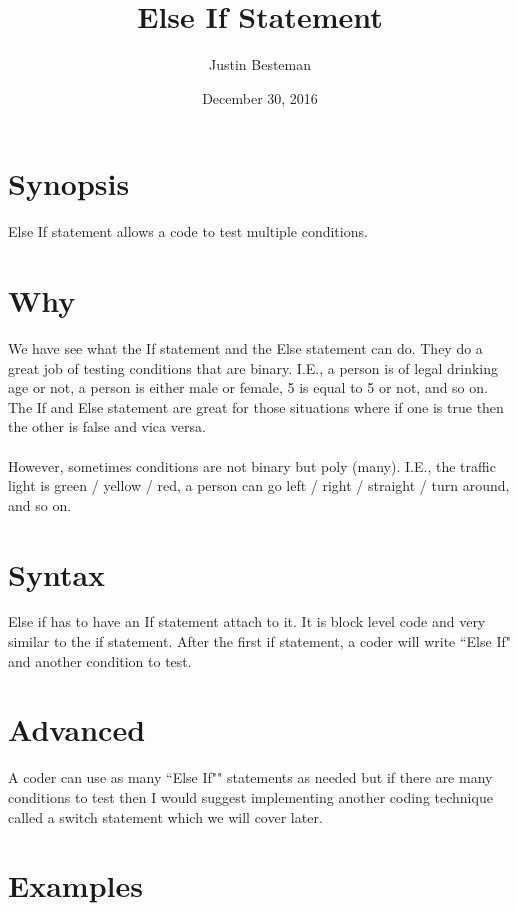 \documentclass[12pt, letterpaper]{article}
\title{Else If Statement}
\author{Justin Besteman}
\date{December 30, 2016}
\begin{document}
\maketitle


\section*{Synopsis}

Else If statement allows a code to test multiple conditions.

\section*{Why}

We have see what the If statement and the Else statement can do. They do a great job of testing conditions that are binary. I.E., a person is of legal drinking age or not, a person is either male or female, 5 is equal to 5 or not, and so on. The If and Else statement are great for those situations where if one is true then the other is false and vica versa. \\ \\
However, sometimes conditions are not binary but poly (many). I.E., the traffic light is green / yellow / red, a person can go left / right / straight / turn around, and so on. \\

\section*{Syntax}

Else if has to have an If statement attach to it. It is block level code and very similar to the if statement. After the first if statement, a coder will write ``Else If" and another condition to test.

\section*{Advanced}

A coder can use as many ``Else If"" statements as needed but if there are many conditions to test then I would suggest implementing another coding technique called a switch statement which we will cover later.

\section*{Examples}
\end{document}
